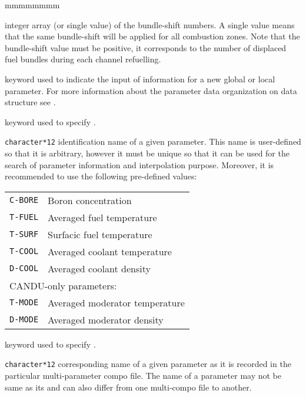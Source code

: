 \begin{ListeDeDescription}{mmmmmmmm}
\item[\dusa{ishift}] integer array (or single value) of the bundle-shift numbers.
A single  value means that the same bundle-shift will be applied for
all combustion zones. Note that the bundle-shift value must be positive, it
corresponds to the number of displaced fuel bundles during each channel refuelling.

\item[\moc{ADD-PARAM}] keyword used to indicate the input of information
for a new global or local parameter. For more information about the parameter
data organization on  data structure see .

\item[\moc{PNAME}] keyword used to specify .

\item[\dusa{PNAME}] \texttt{character*12} identification name of a given
parameter. This name is user-defined so that it is arbitrary, however
it must be unique so that it can be used for the search of parameter information
and interpolation purpose. Moreover, it is recommended to use the following pre-defined
values:

\begin{tabular}{|c|l|}
\hline
{\tt C-BORE} & Boron concentration \\
{\tt T-FUEL} & Averaged fuel temperature \\
{\tt T-SURF} & Surfacic fuel temperature \\
{\tt T-COOL} & Averaged coolant temperature \\
{\tt D-COOL} & Averaged coolant density \\
\hline
\multicolumn{2}{|l|}{CANDU-only parameters:} \\
\hline
{\tt T-MODE} & Averaged moderator temperature\\
{\tt D-MODE} & Averaged moderator density \\
\hline
\end{tabular}

\item[\moc{PARKEY}] keyword used to specify .

\item[\dusa{PARKEY}] \texttt{character*12} corresponding name of a given
parameter as it is recorded in the particular multi-parameter compo file. The
 name of a parameter may not be same as its 
and can also differ from one multi-compo file to another.


\end{ListeDeDescription}
